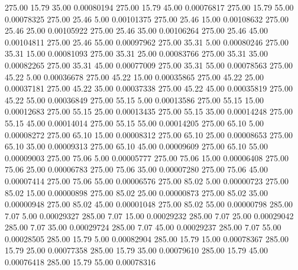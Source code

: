     275.00     15.79     35.00     0.00080194
    275.00     15.79     45.00     0.00076817
    275.00     15.79     55.00     0.00078325
    275.00     25.46      5.00     0.00101375
    275.00     25.46     15.00     0.00108632
    275.00     25.46     25.00     0.00105922
    275.00     25.46     35.00     0.00106264
    275.00     25.46     45.00     0.00104811
    275.00     25.46     55.00     0.00097962
    275.00     35.31      5.00     0.00080246
    275.00     35.31     15.00     0.00081093
    275.00     35.31     25.00     0.00083766
    275.00     35.31     35.00     0.00082265
    275.00     35.31     45.00     0.00077009
    275.00     35.31     55.00     0.00078563
    275.00     45.22      5.00     0.00036678
    275.00     45.22     15.00     0.00035865
    275.00     45.22     25.00     0.00037181
    275.00     45.22     35.00     0.00037338
    275.00     45.22     45.00     0.00035819
    275.00     45.22     55.00     0.00036849
    275.00     55.15      5.00     0.00013586
    275.00     55.15     15.00     0.00012683
    275.00     55.15     25.00     0.00013435
    275.00     55.15     35.00     0.00014248
    275.00     55.15     45.00     0.00014014
    275.00     55.15     55.00     0.00014205
    275.00     65.10      5.00     0.00008272
    275.00     65.10     15.00     0.00008312
    275.00     65.10     25.00     0.00008653
    275.00     65.10     35.00     0.00009313
    275.00     65.10     45.00     0.00009609
    275.00     65.10     55.00     0.00009003
    275.00     75.06      5.00     0.00005777
    275.00     75.06     15.00     0.00006408
    275.00     75.06     25.00     0.00006783
    275.00     75.06     35.00     0.00007280
    275.00     75.06     45.00     0.00007414
    275.00     75.06     55.00     0.00006576
    275.00     85.02      5.00     0.00000723
    275.00     85.02     15.00     0.00000898
    275.00     85.02     25.00     0.00000873
    275.00     85.02     35.00     0.00000948
    275.00     85.02     45.00     0.00001048
    275.00     85.02     55.00     0.00000798
    285.00      7.07      5.00     0.00029327
    285.00      7.07     15.00     0.00029232
    285.00      7.07     25.00     0.00029042
    285.00      7.07     35.00     0.00029724
    285.00      7.07     45.00     0.00029237
    285.00      7.07     55.00     0.00028505
    285.00     15.79      5.00     0.00082904
    285.00     15.79     15.00     0.00078367
    285.00     15.79     25.00     0.00077358
    285.00     15.79     35.00     0.00079610
    285.00     15.79     45.00     0.00076418
    285.00     15.79     55.00     0.00078316
